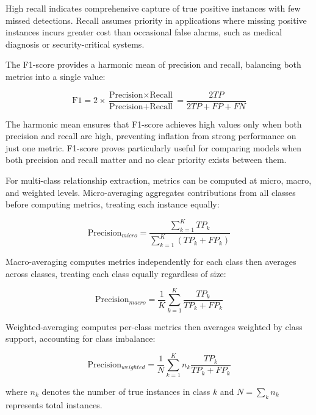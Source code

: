 \documentclass[12pt,a4paper]{report}
\begin{document}
High recall indicates comprehensive capture of true positive instances with few missed detections. Recall assumes priority in applications where missing positive instances incurs greater cost than occasional false alarms, such as medical diagnosis or security-critical systems.

The F1-score provides a harmonic mean of precision and recall, balancing both metrics into a single value:

\begin{equation}
\text{F1} = 2 \times \frac{\text{Precision} \times \text{Recall}}{\text{Precision} + \text{Recall}} = \frac{2TP}{2TP + FP + FN}
\end{equation}

The harmonic mean ensures that F1-score achieves high values only when both precision and recall are high, preventing inflation from strong performance on just one metric. F1-score proves particularly useful for comparing models when both precision and recall matter and no clear priority exists between them.

For multi-class relationship extraction, metrics can be computed at micro, macro, and weighted levels. Micro-averaging aggregates contributions from all classes before computing metrics, treating each instance equally:

\begin{equation}
\text{Precision}_{micro} = \frac{\sum_{k=1}^K TP_k}{\sum_{k=1}^K (TP_k + FP_k)}
\end{equation}

Macro-averaging computes metrics independently for each class then averages across classes, treating each class equally regardless of size:

\begin{equation}
\text{Precision}_{macro} = \frac{1}{K}\sum_{k=1}^K \frac{TP_k}{TP_k + FP_k}
\end{equation}

Weighted-averaging computes per-class metrics then averages weighted by class support, accounting for class imbalance:

\begin{equation}
\text{Precision}_{weighted} = \frac{1}{N}\sum_{k=1}^K n_k \frac{TP_k}{TP_k + FP_k}
\end{equation}

where $n_k$ denotes the number of true instances in class $k$ and $N = \sum_k n_k$ represents total instances.
\end{document}
